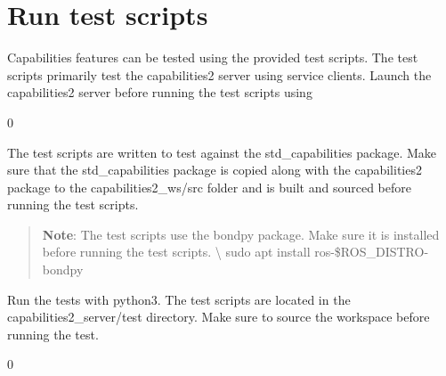 \chapter{Run test scripts}
\hypertarget{md_docs_2run__test__scripts}{}\label{md_docs_2run__test__scripts}
\label{md_docs_2run__test__scripts_autotoc_md89}%
%
 Capabilities features can be tested using the provided test scripts. The test scripts primarily test the capabilities2 server using service clients. Launch the capabilities2 server before running the test scripts using


\begin{DoxyCode}{0}

\end{DoxyCode}


The test scripts are written to test against the {\ttfamily std\+\_\+capabilities} package. Make sure that the {\ttfamily std\+\_\+capabilities} package is copied along with the {\ttfamily capabilities2} package to the {\ttfamily capabilities2\+\_\+ws/src} folder and is built and sourced before running the test scripts.

\begin{quote}
{\bfseries{Note}}\+: The test scripts use the {\ttfamily bondpy} package. Make sure it is installed before running the test scripts. \textbackslash{} {\ttfamily sudo apt install ros-\/\$ROS\+\_\+\+DISTRO-\/bondpy} \end{quote}
Run the tests with python3. The test scripts are located in the {\ttfamily capabilities2\+\_\+server/test} directory. Make sure to source the workspace before running the test.


\begin{DoxyCode}{0}

\end{DoxyCode}


